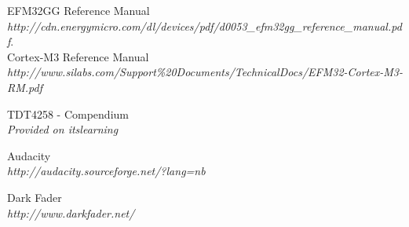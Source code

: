 
\begin{thebibliography}{9}

  EFM32GG Reference Manual\\
  \emph{http://cdn.energymicro.com/dl/devices/pdf/d0053\_efm32gg\_reference\_manual.pdf}.\\

 Cortex-M3 Reference Manual\\
	\emph{http://www.silabs.com/Support\%20Documents/TechnicalDocs/EFM32-Cortex-M3-RM.pdf}

 TDT4258 - Compendium\\
	\emph{Provided on itslearning}

 Audacity \\
	\emph{http://audacity.sourceforge.net/?lang=nb}

 Dark Fader \\
	\emph{http://www.darkfader.net/}

\end{thebibliography}